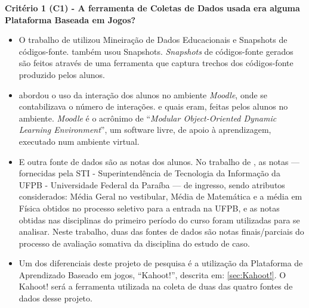 \documentclass[
	12pt,				%
	openright,			%
	oneside,
	a4paper,			%
	english,			%
	french,				%
	spanish,			%
	brazil,				%
	]{abntex2}
\begin{document}

\textbf{Critério 1 (C1) - A ferramenta de Coletas de Dados usada era alguma Plataforma Baseada em Jogos?}

\begin{itemize}
    \item O trabalho de  utilizou Mineiração de Dados Educacionais e Snapshots de códigos-fonte.  também usou Snapshots. \textit{Snapshots} de códigos-fonte gerados são feitos através de uma ferramenta que captura trechos dos códigos-fonte produzido pelos alunos.
    \item {} abordou o uso da interação dos alunos no ambiente \textit{Moodle}, onde se contabilizava o número de interações. e quais eram, feitas pelos alunos no ambiente. \textit{Moodle} é o acrônimo de ``\textit{Modular Object-Oriented Dynamic Learning Environment}'', um software livre, de apoio à aprendizagem, executado num ambiente virtual.
    \item E outra fonte de dados são as notas dos alunos. No trabalho de , as notas --- fornecidas pela STI - Superintendência de Tecnologia da Informação da UFPB - Universidade Federal da Paraíba --- de ingresso, sendo atributos considerados: Média Geral no vestibular, Média de Matemática e a média em Física obtidos no processo seletivo para a entrada na UFPB, e as notas obtidas nas disciplinas do primeiro período do curso foram utilizadas para se analisar. Neste trabalho, duas das fontes de dados são notas finais/parciais do processo de avaliação somativa da disciplina do estudo de caso.
    \item Um dos diferenciais deste projeto de pesquisa é a utilização da Plataforma de Aprendizado Baseado em jogos, ``Kahoot!'', descrita em: \ref{sec:Kahoot!}. O Kahoot! será a ferramenta utilizada na coleta de duas das quatro fontes de dados desse projeto.
\end{itemize}
\end{document}
